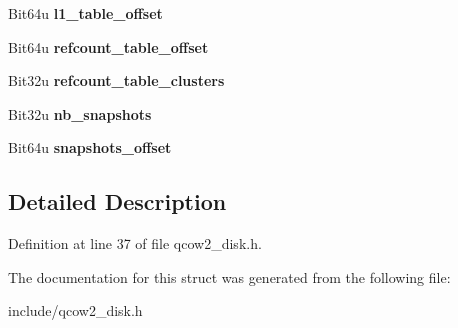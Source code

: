 \begin{DoxyCompactItemize}
\item 
\hypertarget{structQCow2Image_1_1QCow2Header_ad9af65b6779543b3fbb7b0582a4706f3}{Bit64u {\bfseries l1\-\_\-table\-\_\-offset}}\label{structQCow2Image_1_1QCow2Header_ad9af65b6779543b3fbb7b0582a4706f3}

\item 
\hypertarget{structQCow2Image_1_1QCow2Header_aa3f4919642667cfdbe5c12d4666e70b2}{Bit64u {\bfseries refcount\-\_\-table\-\_\-offset}}\label{structQCow2Image_1_1QCow2Header_aa3f4919642667cfdbe5c12d4666e70b2}

\item 
\hypertarget{structQCow2Image_1_1QCow2Header_a701d525e82dfc85043eab142e6b8596b}{Bit32u {\bfseries refcount\-\_\-table\-\_\-clusters}}\label{structQCow2Image_1_1QCow2Header_a701d525e82dfc85043eab142e6b8596b}

\item 
\hypertarget{structQCow2Image_1_1QCow2Header_a372bb1060c2be8f5b12030074c4d73dd}{Bit32u {\bfseries nb\-\_\-snapshots}}\label{structQCow2Image_1_1QCow2Header_a372bb1060c2be8f5b12030074c4d73dd}

\item 
\hypertarget{structQCow2Image_1_1QCow2Header_af9cfe897025574c06c05b9d763a4f9de}{Bit64u {\bfseries snapshots\-\_\-offset}}\label{structQCow2Image_1_1QCow2Header_af9cfe897025574c06c05b9d763a4f9de}

\end{DoxyCompactItemize}


\subsection{Detailed Description}


Definition at line 37 of file qcow2\-\_\-disk.\-h.



The documentation for this struct was generated from the following file\-:\begin{DoxyCompactItemize}
\item 
include/qcow2\-\_\-disk.\-h\end{DoxyCompactItemize}
